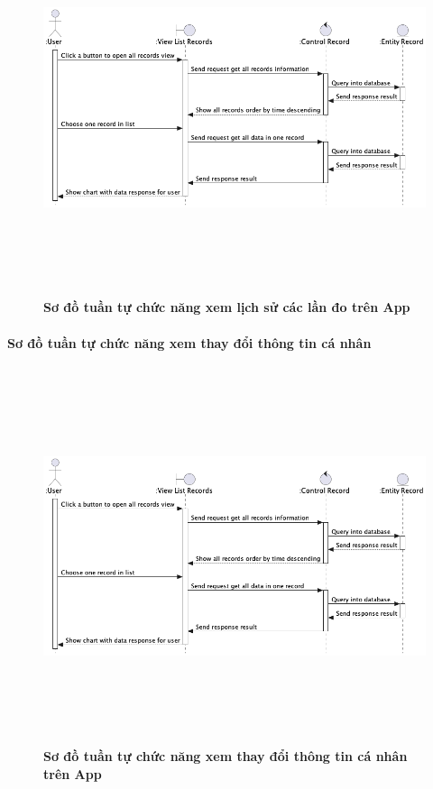     \begin{figure}[H]
         \centering
         \includegraphics[width=16cm,height=11cm]{Images/mobile_app/view_record_timeline.png}
         \caption[Sơ đồ tuần tự chức năng xem lịch sử các lần đo trên App]{\bfseries \fontsize{12pt}{0pt}
         \selectfont Sơ đồ tuần tự chức năng xem lịch sử các lần đo trên App}
         \label{hinh21} %
    \end{figure}

\paragraph{Sơ đồ tuần tự chức năng xem thay đổi thông tin cá nhân}
\mbox{}

  \begin{figure}[H]
        \centering
        \includegraphics[width=16cm,height=11cm]{Images/mobile_app/view_record_timeline.png}
        \caption[Sơ đồ tuần tự chức năng xem thay đổi thông tin cá nhân trên App]{\bfseries \fontsize{12pt}{0pt}
        \selectfont Sơ đồ tuần tự chức năng xem thay đổi thông tin cá nhân trên App}
        \label{hinh21} %
  \end{figure}


